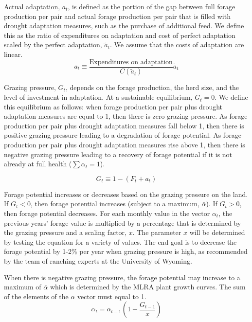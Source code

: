 \documentclass[11pt]{article}
\begin{document}
Actual adaptation, $a_t$, is defined as the portion of the gap between full forage production per pair and actual forage production per pair that is filled with drought adaptation measures, such as the purchase of additional feed. We define this as the ratio of expenditures on adaptation and cost of perfect adaptation scaled by the perfect adaptation, $\tilde{a}_t$. We assume that the costs of adaptation are linear. 
\begin{equation}
a_t \equiv \frac{\text{Expenditures on adaptation}}{C(\tilde{a}_t)} \tilde{a}_t
\end{equation}

Grazing pressure, $G_t$, depends on the forage production, the herd size, and the level of investment in adaptation. 
At a sustainable equilibrium, $G_t = 0$. 
We define this equilibrium as follows: when forage production per pair plus drought adaptation measures are equal to 1, then there is zero grazing pressure. As forage production per pair plus drought adaptation measures fall below 1, then there is positive grazing pressure leading to a degradation of forage potential. As forage production per pair plus drought adaptation measures rise above 1, then there is negative grazing pressure leading to a recovery of forage potential if it is not already at full health ($\sum \alpha_t = 1$).  

\begin{equation}
G_t \equiv 1 - (F_t + a_t)
\end{equation}

Forage potential increases or decreases based on the grazing pressure on the land. If $G_t < 0$, then forage potential increases (subject to a maximum, $\bar{\alpha}$). If $G_t > 0$, then forage potential decreases. For each monthly value in the vector $\alpha_{t}$, the previous years' forage value is multiplied by a percentage that is determined by the grazing pressure and a scaling factor, $x$. The parameter $x$ will be determined by testing the equation for a variety of values. The end goal is to decrease the forage potential by 1-2\% per year when grazing pressure is high, as recommended by the team of ranching experts at the University of Wyoming. 

When there is negative grazing pressure, the forage potential may increase to a maximum of $\bar{\alpha}$ which is determined by the MLRA plant growth curves. The sum of the elements of the $\bar{\alpha}$ vector must equal to 1.
\begin{equation}
\alpha_t = \alpha_{t-1} \left(1 - \frac{G_{t-1}}{x}\right)
\end{equation}
\end{document}
